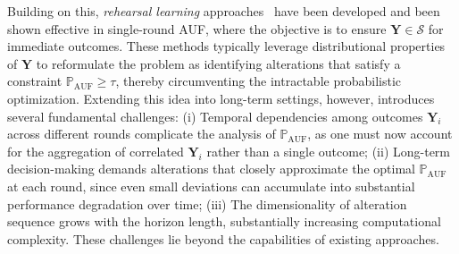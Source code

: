 \documentclass{article}
\theoremstyle{plain}
\theoremstyle{definition}
\theoremstyle{remark}
\def \sS {\mathcal{S}}
\def \Y {\mathbf{Y}}
\begin{document}
Building on this, \emph{rehearsal learning} approaches~\citep{qint2023srm, du2024micns} have been developed and been shown effective in single-round AUF, where the objective is to ensure \(\Y \in \sS\) for immediate outcomes.
These methods typically leverage distributional properties of \(\Y\) to reformulate the problem as identifying alterations that satisfy a constraint $\mathbb{P}_{\operatorname*{AUF}} \geq \tau$, thereby circumventing the intractable probabilistic optimization. 
Extending this idea into long-term settings, however, introduces several fundamental challenges:
(i) Temporal dependencies among outcomes \(\Y_i\) across different rounds complicate the analysis of $\mathbb{P}_{\operatorname*{AUF}}$, as one must now account for the aggregation of correlated \(\Y_i\) rather than a single outcome;
(ii) Long-term decision-making demands alterations that closely approximate the optimal $\mathbb{P}_{\operatorname{AUF}}$ at each round, since even small deviations can accumulate into substantial performance degradation over time; 
(iii) The dimensionality of alteration sequence grows with the horizon length, substantially increasing computational complexity.
These challenges lie beyond the capabilities of existing approaches.
\end{document}
